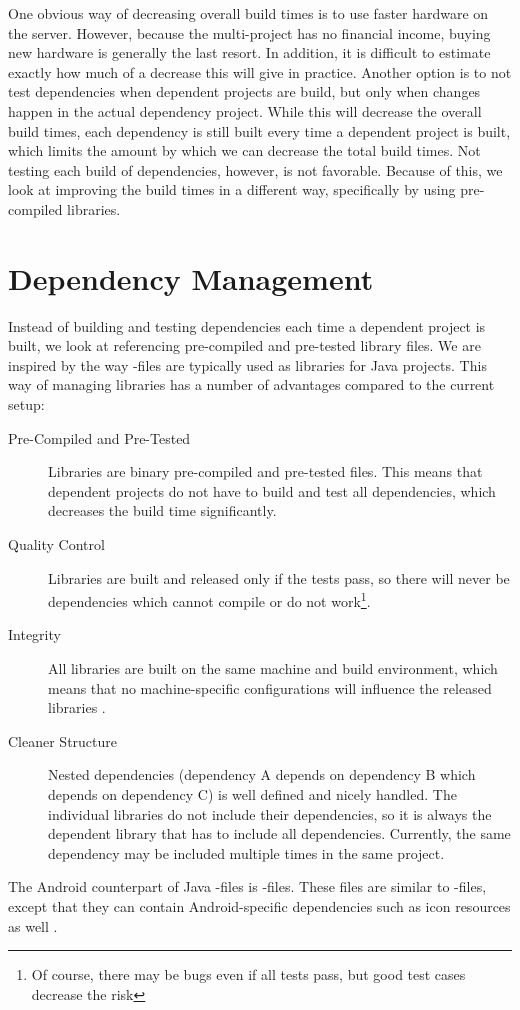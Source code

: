 One obvious way of decreasing overall build times is to use faster hardware on the server. However, because the multi-project has no financial income, buying new hardware is generally the last resort. In addition, it is difficult to estimate exactly how much of a decrease this will give in practice. Another option is to not test dependencies when dependent projects are build, but only when changes happen in the actual dependency project. While this will decrease the overall build times, each dependency is still built every time a dependent project is built, which limits the amount by which we can decrease the total build times. Not testing each build of dependencies, however, is not favorable. Because of this, we look at improving the build times in a different way, specifically by using pre-compiled libraries.

\section{Dependency Management}\label{sec:dependency_management}
Instead of building and testing dependencies each time a dependent project is built, we look at referencing pre-compiled and pre-tested library files. We are inspired by the way -files are typically used as libraries for Java projects. This way of managing libraries has a number of advantages compared to the current setup:
\begin{description}
  \item [Pre-Compiled and Pre-Tested] Libraries are binary pre-compiled and pre-tested files. This means that dependent projects do not have to build and test all dependencies, which decreases the build time significantly.
  \item[Quality Control] Libraries are built and released only if the tests pass, so there will never be dependencies which cannot compile or do not work\footnote{Of course, there may be bugs even if all tests pass, but good test cases decrease the risk}.
  \item[Integrity] All libraries are built on the same machine and build environment, which means that no machine-specific configurations will influence the released libraries \parencite{humble2010, huttermann2014}.
  \item[Cleaner Structure] Nested dependencies (dependency A depends on dependency B which depends on dependency C) is well defined and nicely handled. The individual libraries do not include their dependencies, so it is always the dependent library that has to include all dependencies. Currently, the same dependency may be included multiple times in the same project.
\end{description}
The Android counterpart of Java -files is -files. These files are similar to -files, except that they can contain Android-specific dependencies such as icon resources as well \parencite{android-aar}.

